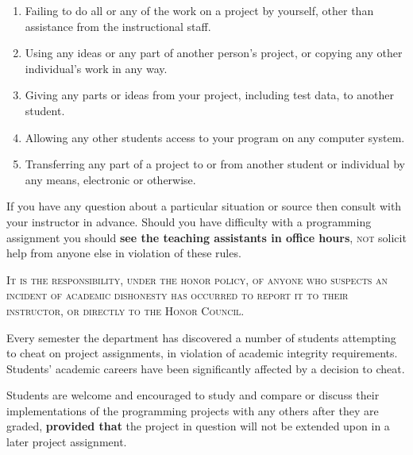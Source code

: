 \documentclass[10pt]{article}
\begin{document}
    \vspace{-1.5mm}

    \begin{enumerate}

      \addtolength{\itemsep}{-1.25mm}

      \item Failing to do all or any of the work on a project by yourself,
            other than assistance from the instructional staff.

      \item Using any ideas or any part of another person's project, or
            copying any other individual's work in any way.

      \item Giving any parts or ideas from your project, including test
            data, to another student.

      \item Allowing any other students access to your program on any
            computer system.

      \item Transferring any part of a project to or from another student or
            individual by any means, electronic or otherwise.

    \end{enumerate}

    \vspace{-1.5mm}

    If you have any question about a particular situation or source then
  consult with your instructor in advance.  Should you have difficulty with a
  programming assignment you should \textbf{see the teaching assistants in
  office hours}, \textsc{not} solicit help from anyone else in violation of
  these rules.

    \textsc{It is the responsibility, under the honor policy, of anyone who
  suspects an incident of academic dishonesty has occurred to report it to
  their instructor, or directly to the Honor Council.}

    Every semester the department has discovered a number of students
  attempting to cheat on project assignments, in violation of academic
  integrity requirements.  Students' academic careers have been significantly
  affected by a decision to cheat.

    Students are welcome and encouraged to study and compare or discuss their
  implementations of the programming projects with any others after they are
  graded, \textbf{provided that} the project in question will not be
  extended upon in a later project assignment.
\end{document}
